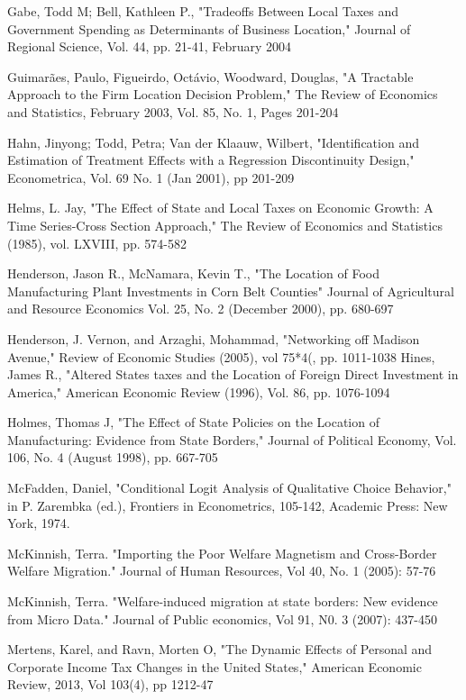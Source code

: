 \documentclass[12pt,a4paper]{article}
\begin{document}
\begin{thebibliography}{99}
Gabe, Todd M; Bell, Kathleen P., "Tradeoffs Between Local Taxes and Government Spending as Determinants of Business Location," Journal of Regional Science, Vol. 44, pp. 21-41, February 2004 

Guimarães, Paulo, Figueirdo, Octávio, Woodward, Douglas, "A Tractable Approach to the Firm Location Decision Problem," The Review of Economics and Statistics, February 2003, Vol. 85, No. 1, Pages 201-204

Hahn, Jinyong; Todd, Petra; Van der Klaauw, Wilbert, "Identification and Estimation of Treatment Effects with a Regression Discontinuity Design," Econometrica, Vol. 69 No. 1 (Jan 2001), pp 201-209

Helms, L. Jay, "The Effect of State and Local Taxes on Economic Growth: A Time Series-Cross Section Approach," The Review of Economics and Statistics (1985), vol. LXVIII, pp. 574-582

Henderson, Jason R., McNamara, Kevin T., "The Location of Food Manufacturing Plant Investments in Corn Belt Counties" Journal of Agricultural and Resource Economics
Vol. 25, No. 2 (December 2000), pp. 680-697 

Henderson, J. Vernon, and Arzaghi, Mohammad, "Networking off Madison Avenue," Review of Economic Studies (2005), vol 75*4(, pp. 1011-1038
Hines, James R., "Altered States taxes and the Location of Foreign Direct Investment in America," American Economic Review (1996), Vol. 86, pp. 1076-1094

Holmes, Thomas J, "The Effect of State Policies on the Location of Manufacturing: Evidence from State Borders," Journal of Political Economy, Vol. 106, No. 4 (August 1998), pp. 667-705

McFadden, Daniel, "Conditional Logit Analysis of Qualitative Choice Behavior," in P. Zarembka (ed.), Frontiers in Econometrics, 105-142, Academic Press: New York, 1974.

McKinnish, Terra. "Importing the Poor Welfare Magnetism and Cross-Border Welfare Migration." Journal of Human Resources, Vol 40, No. 1 (2005): 57-76

McKinnish, Terra. "Welfare-induced migration at state borders: New evidence from Micro Data." Journal of Public economics, Vol 91, N0. 3 (2007): 437-450

Mertens, Karel, and Ravn, Morten O, "The Dynamic Effects of Personal and Corporate Income Tax Changes in the United States," American Economic Review, 2013, Vol 103(4), pp 1212-47


\end{thebibliography}
\end{document}
